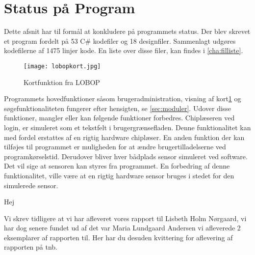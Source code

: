 \newpage
\section{Status på Program} 
\label{sec:status_p_program}



Dette afsnit har til formål at konkludere på programmets status. Der blev skrevet et program fordelt på 53 C\# kodefiler og 18 designfiler. Sammenlagt udgøres kodefilerne af 1475 linjer kode. En liste over disse filer, kan findes i \cref{cha:filliste}. 

\begin{figure}
  \texttt{[image: lobopkort.jpg]}
  \caption{Kortfunktion fra LOBOP}
  \label{fig:lobopkort}
\end{figure}


Programmets hovedfunktioner såsom brugeradministration, visning af kort\cref{fig:lobopkort} og søgefunktionaliteten fungerer efter hensigten, se \cref{sec:moduler}. Udover disse funktioner, mangler eller kan følgende funktioner forbedres. Chiplæseren ved login, er simuleret som et tekstfelt i brugergrænsefladen. Denne funktionalitet kan med fordel erstattes af en rigtig hardware chiplæser. En anden funktion der kan tilføjes til programmet er muligheden for at ændre brugertilladelserne ved programkørselstid. Derudover bliver hver bådplads sensor simuleret ved software. Det vil sige at sensoren kan styres fra programmet. En forbedring af denne funktionalitet, ville være at en rigtig hardware sensor bruges i stedet for den simulerede sensor.






Hej

Vi skrev tidligere at vi har afleveret vores rapport til Lisbeth Holm Nørgaard, vi har dog senere fundet ud af det var Maria Lundgaard Andersen vi afleverede 2 eksemplarer af rapporten til. Her har du desuden kvittering for aflevering af rapporten på tnb.  



 
